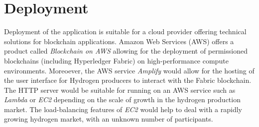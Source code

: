 \section{Deployment}
Deployment of the application is suitable for a cloud
provider offering technical solutions for blockchain applications.
Amazon Web Services (AWS) offers a product called
\textit{Blockchain on AWS} allowing for the deployment
of permissioned blockchains (including Hyperledger Fabric)
on high-performance compute environments. Moreoever, the AWS
service \textit{Amplify} would allow for the hosting of
the user interface for Hydrogen producers to interact with the
Fabric blockchain. The HTTP server would be suitable for
running on an AWS service such as \textit{Lambda} or
\textit{EC2} depending on the scale of growth in the
hydrogen production market. The load-balancing features of
\textit{EC2} would help to deal with a rapidly growing
hydrogen market, with an unknown number of participants.

